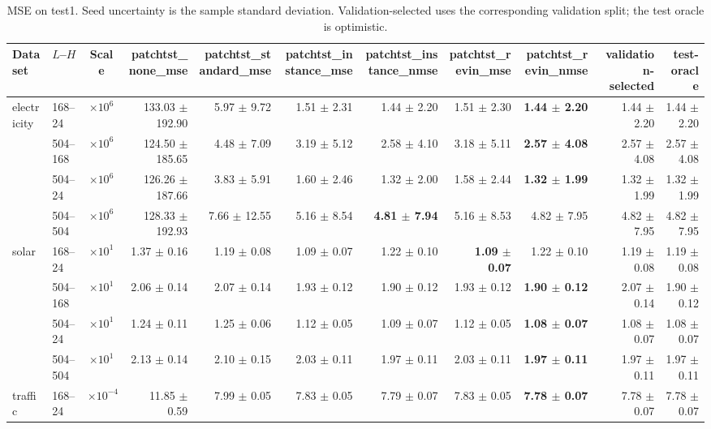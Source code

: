 \begin{table}[htbp]
\centering
\caption{MSE on test1. Seed uncertainty is the sample standard deviation. Validation-selected uses the corresponding validation split; the test oracle is optimistic.}
\begin{tabular}{llcrrrrrrr|r}
\toprule
Dataset & $L$--$H$ & Scale & patchtst\_none\_mse & patchtst\_standard\_mse & patchtst\_instance\_mse & patchtst\_instance\_nmse & patchtst\_revin\_mse & patchtst\_revin\_nmse & validation-selected & test-oracle \\
\midrule
electricity & 168--24 & $\times 10^{6}$ & 133.03 $\pm$ 192.90 & 5.97 $\pm$ 9.72 & 1.51 $\pm$ 2.31 & 1.44 $\pm$ 2.20 & 1.51 $\pm$ 2.30 & \textbf{1.44 $\pm$ 2.20} & 1.44 $\pm$ 2.20 & 1.44 $\pm$ 2.20 \\
 & 504--168 & $\times 10^{6}$ & 124.50 $\pm$ 185.65 & 4.48 $\pm$ 7.09 & 3.19 $\pm$ 5.12 & 2.58 $\pm$ 4.10 & 3.18 $\pm$ 5.11 & \textbf{2.57 $\pm$ 4.08} & 2.57 $\pm$ 4.08 & 2.57 $\pm$ 4.08 \\
 & 504--24 & $\times 10^{6}$ & 126.26 $\pm$ 187.66 & 3.83 $\pm$ 5.91 & 1.60 $\pm$ 2.46 & 1.32 $\pm$ 2.00 & 1.58 $\pm$ 2.44 & \textbf{1.32 $\pm$ 1.99} & 1.32 $\pm$ 1.99 & 1.32 $\pm$ 1.99 \\
 & 504--504 & $\times 10^{6}$ & 128.33 $\pm$ 192.93 & 7.66 $\pm$ 12.55 & 5.16 $\pm$ 8.54 & \textbf{4.81 $\pm$ 7.94} & 5.16 $\pm$ 8.53 & 4.82 $\pm$ 7.95 & 4.82 $\pm$ 7.95 & 4.82 $\pm$ 7.95 \\
\midrule
solar & 168--24 & $\times 10^{1}$ & 1.37 $\pm$ 0.16 & 1.19 $\pm$ 0.08 & 1.09 $\pm$ 0.07 & 1.22 $\pm$ 0.10 & \textbf{1.09 $\pm$ 0.07} & 1.22 $\pm$ 0.10 & 1.19 $\pm$ 0.08 & 1.19 $\pm$ 0.08 \\
 & 504--168 & $\times 10^{1}$ & 2.06 $\pm$ 0.14 & 2.07 $\pm$ 0.14 & 1.93 $\pm$ 0.12 & 1.90 $\pm$ 0.12 & 1.93 $\pm$ 0.12 & \textbf{1.90 $\pm$ 0.12} & 2.07 $\pm$ 0.14 & 1.90 $\pm$ 0.12 \\
 & 504--24 & $\times 10^{1}$ & 1.24 $\pm$ 0.11 & 1.25 $\pm$ 0.06 & 1.12 $\pm$ 0.05 & 1.09 $\pm$ 0.07 & 1.12 $\pm$ 0.05 & \textbf{1.08 $\pm$ 0.07} & 1.08 $\pm$ 0.07 & 1.08 $\pm$ 0.07 \\
 & 504--504 & $\times 10^{1}$ & 2.13 $\pm$ 0.14 & 2.10 $\pm$ 0.15 & 2.03 $\pm$ 0.11 & 1.97 $\pm$ 0.11 & 2.03 $\pm$ 0.11 & \textbf{1.97 $\pm$ 0.11} & 1.97 $\pm$ 0.11 & 1.97 $\pm$ 0.11 \\
\midrule
traffic & 168--24 & $\times 10^{-4}$ & 11.85 $\pm$ 0.59 & 7.99 $\pm$ 0.05 & 7.83 $\pm$ 0.05 & 7.79 $\pm$ 0.07 & 7.83 $\pm$ 0.05 & \textbf{7.78 $\pm$ 0.07} & 7.78 $\pm$ 0.07 & 7.78 $\pm$ 0.07 \\

\end{tabular}
\end{table}

